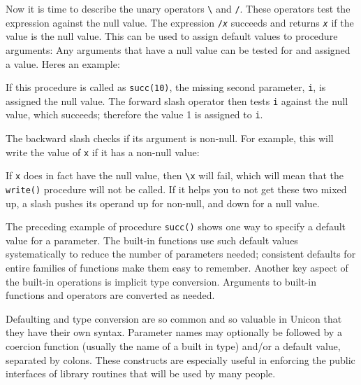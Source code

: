 Now it is time to describe the unary operators \texttt{{\textbackslash}}
and \texttt{/}. These operators test the expression against the null
value. The expression \texttt{/}\texttt{\textit{x}}
succeeds and returns \texttt{\textit{x}} if the value is the null
value. This can be used to assign default values to procedure
arguments: Any arguments that have a null value can be tested for and
assigned a value. Here{\textquotesingle}s an example:


If this procedure is called as \texttt{succ(10)}, the missing second
parameter, \texttt{i}, is assigned the null value. The forward slash
operator then tests \texttt{i} against the null value, which succeeds;
therefore the value 1 is assigned to \texttt{i}.

The backward slash checks if its argument is non-null. For example, this
will write the value of \texttt{x} if it has a non-null value:


If \texttt{x} does in fact have the null value, then \texttt{{\textbackslash}x} will fail, which will mean
that the \texttt{write()} procedure will not be called. If it helps you
to not get these two mixed up, a slash pushes its operand
{\textquotedbl}up{\textquotedbl} for non-null, and
{\textquotedbl}down{\textquotedbl} for a null value.

The preceding example of procedure \texttt{succ()} shows one way to
specify a default value for a parameter. The built-in functions use
such default values systematically to reduce the number of parameters
needed; consistent defaults for entire families of functions make them
easy to remember. Another key aspect of the built-in operations is
implicit type conversion. Arguments to built-in functions and operators
are converted as needed.

Defaulting and type
conversion are so common and so valuable in Unicon that they have their
own syntax. Parameter names may optionally be followed by a coercion
function (usually the name of a built in type) and/or a default value,
separated by colons. These constructs are especially useful in
enforcing the public interfaces of library routines that will be used
by many people.

